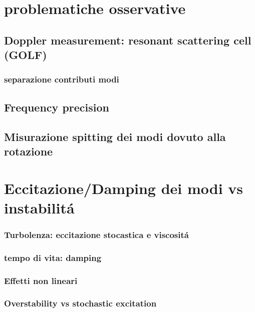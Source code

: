 \documentclass[../main.tex]{subfiles}
\begin{document}
\chapter{problematiche osservative}

\section{Doppler measurement: resonant scattering cell (GOLF)}

\subsection{separazione contributi modi}

\section{Frequency precision}

\section{Misurazione spitting dei modi dovuto alla rotazione}

\chapter{Eccitazione/Damping dei modi vs instabilit\'a}

\subsection{Turbolenza: eccitazione stocastica e viscosit\'a}

\subsection{tempo di vita: damping}

\subsection{Effetti non lineari}

\subsection{Overstability vs stochastic excitation}
\end{document}
